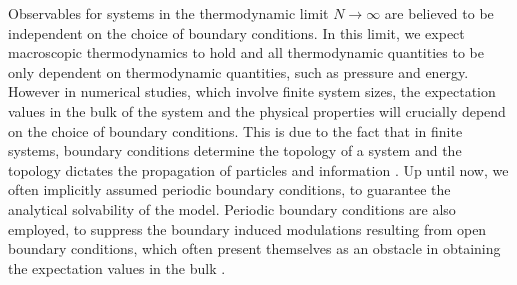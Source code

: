 \documentclass[11pt, a4paper, oneside]{book}
\theoremstyle{definition} %
\begin{document}
Observables for systems in the thermodynamic limit $N \rightarrow \infty$ are believed to be independent on the choice of boundary conditions. In this limit, we expect macroscopic thermodynamics to hold and all thermodynamic quantities to be only dependent on thermodynamic quantities, such as pressure and energy. However in numerical studies, which involve finite system sizes, the expectation values in the bulk of the system and the physical properties will crucially depend on the choice of boundary conditions. This is due to the fact that in finite systems, boundary conditions determine the topology of a system and the topology dictates the propagation of particles and information \cite{Hikihara}. Up until now, we often implicitly assumed periodic boundary conditions, to guarantee the analytical solvability of the model. Periodic boundary conditions are also employed, to suppress the boundary induced modulations resulting from open boundary conditions, which often present themselves as an obstacle in obtaining the expectation values in the bulk \cite{Hotta}\cite{Maruyama}\cite{Gendiar}. \\
\end{document}

